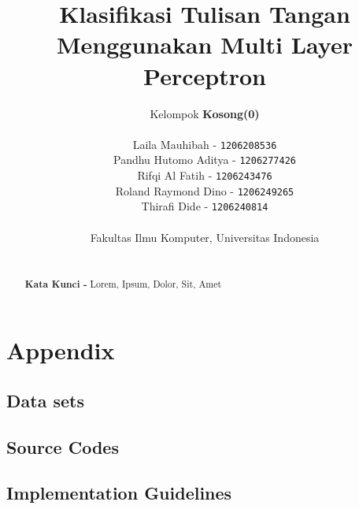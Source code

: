 \documentclass{article}
\begin{document}
\title{Klasifikasi Tulisan Tangan Menggunakan Multi Layer Perceptron}
\author{
	Kelompok \textbf{Kosong(0)} \\
	~\\
	Laila Mauhibah - \texttt{1206208536} \\
	Pandhu Hutomo Aditya - \texttt{1206277426} \\
	Rifqi Al Fatih - \texttt{1206243476} \\
	Roland Raymond Dino - \texttt{1206249265} \\
	Thirafi Dide - \texttt{1206240814} \\
	~\\
	Fakultas Ilmu Komputer, Universitas Indonesia
}

\maketitle

\begin{abstract}
\lipsum[1]
~\\
\noindent \textbf{Kata Kunci - }Lorem, Ipsum, Dolor, Sit, Amet
\end{abstract}

\pagebreak

\tableofcontents

\pagebreak











\pagebreak

\section{Appendix}

	\subsection{Data sets}
	\lipsum[1]

	\subsection{Source Codes}
	\lipsum[1]

	\subsection{Implementation Guidelines}
	\lipsum[1]
\end{document}
